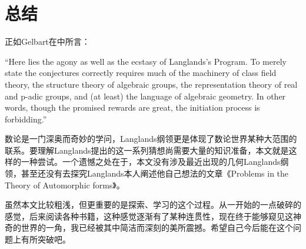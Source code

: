 \chapter{总结}
\label{chap:summary}

正如Gelbart在中所言：

``Here lies the agony as well as the ecstasy of Langlands’s Program. To merely state the conjectures correctly requires much of the machinery of class field theory, the structure theory of algebraic groups, the representation theory of real and p-adic groups, and (at least) the language of algebraic geometry. In other words, though the promised rewards are great, the initiation process is forbidding.''

数论是一门深奥而奇妙的学问，Langlands纲领更是体现了数论世界某种大范围的联系。要理解Langlands提出的这一系列猜想尚需要大量的知识准备，本文就是这样的一种尝试。一个遗憾之处在于，本文没有涉及最近出现的几何Langlands纲领，甚至还没有去探究Langlands本人阐述他自己想法的文章《Problems in the Theory of Automorphic forms》。

虽然本文比较粗浅，但更重要的是探索、学习的这个过程。从一开始的一点破碎的感觉，后来阅读各种书籍，这种感觉逐渐有了某种连贯性，现在终于能够窥见这神奇的世界的一角，我已经被其中简洁而深刻的美所震撼。希望自己今后能在这个问题上有所突破吧。

